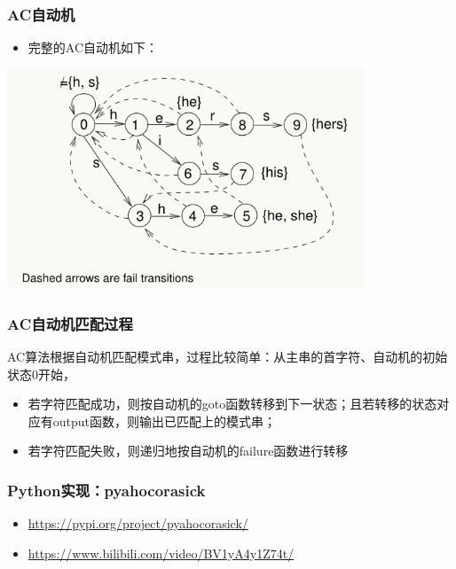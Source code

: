 \begin{frame}[fragile]
  \frametitle{AC自动机}
  \begin{itemize}
  \item 完整的AC自动机如下：
  \end{itemize}

  \begin{center}
  \includegraphics[width=0.8\textwidth]{figs/string/ac.png}
  \end{center}
\end{frame}

\begin{frame}[fragile]
  \frametitle{AC自动机匹配过程}
  AC算法根据自动机匹配模式串，过程比较简单：从主串的首字符、自动机的初始状态0开始，

  \begin{itemize}
  \item 若字符匹配成功，则按自动机的goto函数转移到下一状态；且若转移的状态对应有output函数，则输出已匹配上的模式串；
  \item 若字符匹配失败，则递归地按自动机的failure函数进行转移
  \end{itemize}
\end{frame}


\begin{frame}[fragile]
  \frametitle{Python实现：pyahocorasick}
  \begin{itemize}
  \item \url{https://pypi.org/project/pyahocorasick/}
  \item \url{https://www.bilibili.com/video/BV1yA4y1Z74t/}
  \end{itemize}
\end{frame}